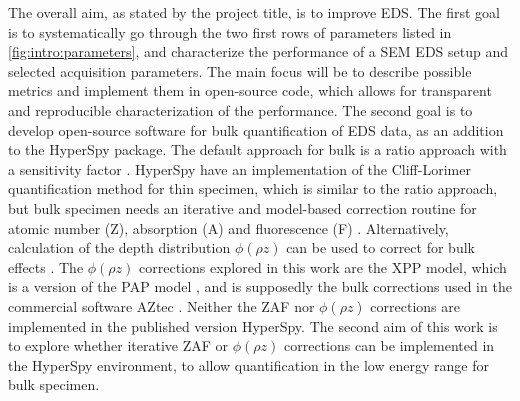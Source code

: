 The overall aim, as stated by the project title, is to improve EDS.
The first goal is to systematically go through the two first rows of parameters listed in \cref{fig:intro:parameters}, and characterize the performance of a SEM EDS setup and selected acquisition parameters.
The main focus will be to describe possible metrics and implement them in open-source code, which allows for transparent and reproducible characterization of the performance.
The second goal is to develop open-source software for bulk quantification of EDS data, as an addition to the HyperSpy package.
The default approach for bulk is a ratio approach with a sensitivity factor \cite{goldstein_scanning_2018}.
HyperSpy have an implementation of the Cliff-Lorimer quantification method for thin specimen, which is similar to the ratio approach, but bulk specimen needs an iterative and model-based correction routine for atomic number (Z), absorption (A) and fluorescence (F) \cite{goldstein_scanning_2018}.
Alternatively, calculation of the depth distribution $\phi (\rho z)$ can be used to correct for bulk effects \cite{goldstein_scanning_2018,pap_1991}.
The $\phi (\rho z)$ corrections explored in this work are the XPP model, which is a version of the PAP model \cite{pap_1991}, and is supposedly the bulk corrections used in the commercial software AZtec \cite{oxford_blog_XPP,aztec_manual}.
Neither the ZAF nor $\phi (\rho z)$ corrections are implemented in the published version HyperSpy.
The second aim of this work is to explore whether iterative ZAF or $\phi (\rho z)$ corrections can be implemented in the HyperSpy environment, to allow quantification in the low energy range for bulk specimen.





